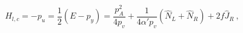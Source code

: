 \begin{equation}
 H_{l,c} = - p_u = \frac{1}{2}(E - p_y) 
  = \frac{p^2_A}{4 p_v}  + \frac{1}{4 \alpha ' p_v} (\hat N _L + \hat N _R) 
   + 2 f \hat J_R ~,
\label{spectrum} 
\end{equation}

